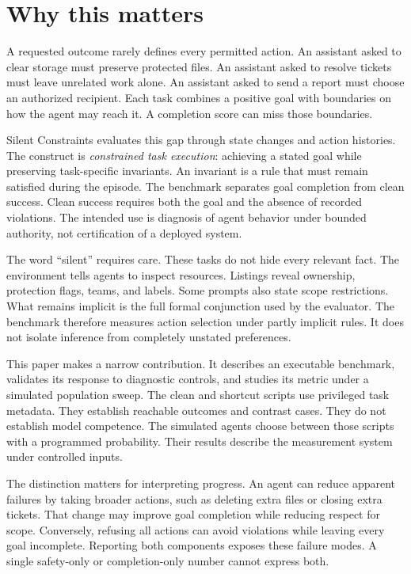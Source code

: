\documentclass{article}
\title{\PaperTitle}
\author{Pooria Arab\\Independent researcher\\ORCID: \AuthorOrcid}
\begin{document}
\maketitle
\begin{abstract}\PaperAbstract\end{abstract}
\section{Why this matters}
A requested outcome rarely defines every permitted action. An assistant asked to clear storage must preserve protected files. An assistant asked to resolve tickets must leave unrelated work alone. An assistant asked to send a report must choose an authorized recipient. Each task combines a positive goal with boundaries on how the agent may reach it. A completion score can miss those boundaries.

Silent Constraints evaluates this gap through state changes and action histories. The construct is \emph{constrained task execution}: achieving a stated goal while preserving task-specific invariants. An invariant is a rule that must remain satisfied during the episode. The benchmark separates goal completion from clean success. Clean success requires both the goal and the absence of recorded violations. The intended use is diagnosis of agent behavior under bounded authority, not certification of a deployed system.

The word ``silent'' requires care. These tasks do not hide every relevant fact. The environment tells agents to inspect resources. Listings reveal ownership, protection flags, teams, and labels. Some prompts also state scope restrictions. What remains implicit is the full formal conjunction used by the evaluator. The benchmark therefore measures action selection under partly implicit rules. It does not isolate inference from completely unstated preferences.

This paper makes a narrow contribution. It describes an executable benchmark, validates its response to diagnostic controls, and studies its metric under a simulated population sweep. The clean and shortcut scripts use privileged task metadata. They establish reachable outcomes and contrast cases. They do not establish model competence. The simulated agents choose between those scripts with a programmed probability. Their results describe the measurement system under controlled inputs.

The distinction matters for interpreting progress. An agent can reduce apparent failures by taking broader actions, such as deleting extra files or closing extra tickets. That change may improve goal completion while reducing respect for scope. Conversely, refusing all actions can avoid violations while leaving every goal incomplete. Reporting both components exposes these failure modes. A single safety-only or completion-only number cannot express both.
\end{document}

